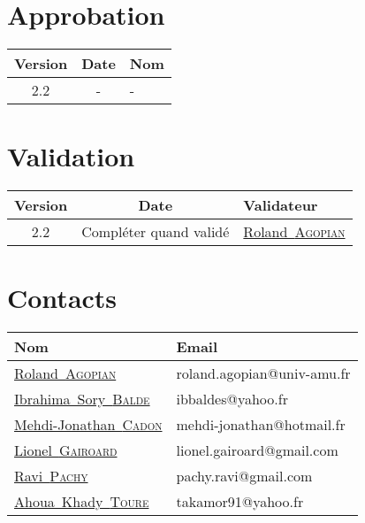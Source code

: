 \documentclass[11pt,fleqn]{book} %
\makeatletter
\newcommand{\roland}{\href{mailto:roland.agopian@univ-amu.fr}{Roland~\textsc{Agopian}}\xspace}
\newcommand{\ravi}{\href{mailto:pachy.ravi@gmail.com}{Ravi~\textsc{Pachy}}\xspace}
\newcommand{\mj}{\href{mailto:mehdi-jonathan@hotmail.fr}{Mehdi-Jonathan~\textsc{Cadon}}\xspace}
\newcommand{\lionel}{\href{mailto:lionel.gairoard@gmail.com}{Lionel~\textsc{Gairoard}}\xspace}
\newcommand{\ibrahima}{\href{mailto:ibbaldes@yahoo.fr}{Ibrahima~Sory~\textsc{Balde}}\xspace}
\newcommand{\khady}{\href{mailto:takamor91@yahoo.fr}{Ahoua~Khady~\textsc{Toure}}\xspace}
\newcommand{\version}{2.2}
\makeatother
\begin{document}
\section*{Approbation}
\noindent
\begin{tabularx}{\linewidth}{|c|c|X|}
\hline
\textbf{Version} & \textbf{Date} & \textbf{Nom} \\\hline\hline
\version & - & - \\\hline
\end{tabularx}

\section*{Validation}
\noindent
\begin{tabularx}{\linewidth}{|c|c|X|}
\hline
\textbf{Version} & \textbf{Date} & \textbf{Validateur}\\
\hline\hline
\version & Compléter quand validé & \roland \\
\hline
\end{tabularx}

\section*{Contacts}
\noindent
\begin{tabularx}{\linewidth}{|l|X|}
\hline
\textbf{Nom} & \textbf{Email}\\
\hline\hline
\roland & roland.agopian@univ-amu.fr \\
\hline\hline
\ibrahima & ibbaldes@yahoo.fr \\
\hline
\mj & mehdi-jonathan@hotmail.fr \\
\hline
\lionel & lionel.gairoard@gmail.com \\
\hline
\ravi & pachy.ravi@gmail.com \\
\hline
\khady & takamor91@yahoo.fr \\
\hline
\end{tabularx}

\end{document}
